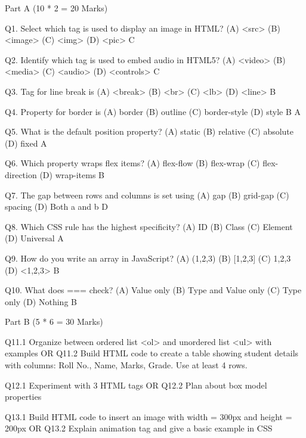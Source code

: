 
Part A (10 * 2 = 20 Marks)

Q1. Select which tag is used to display an image in HTML?
(A) <src> (B) <image> (C) <img> (D) <pic>                                                                  C

Q2. Identify which tag is used to embed audio in HTML5?
(A) <video> (B) <media> (C) <audio> (D) <controls>                                                         C

Q3. Tag for line break is
(A) <break> (B) <br> (C) <lb> (D) <line>                                                                   B

Q4. Property for border is
(A) border (B) outline (C) border-style (D) style  B                                                       A                                                      

Q5. What is the default position property?
(A) static (B) relative (C) absolute (D) fixed                                                             A                                                              

Q6. Which property wraps flex items?
(A) flex-flow (B) flex-wrap (C) flex-direction (D) wrap-items                                              B

Q7. The gap between rows and columns is set using
(A) gap (B) grid-gap (C) spacing (D) Both a and b                                                           D

Q8. Which CSS rule has the highest specificity?
(A) ID (B) Class (C) Element (D) Universal                                                                  A

Q9. How do you write an array in JavaScript?
(A) (1,2,3) (B) [1,2,3] (C) {1,2,3} (D) <1,2,3>                                                             B

Q10. What does === check?
(A) Value only     (B) Type and Value only   (C) Type only    (D) Nothing                                    B


Part B (5 * 6 = 30 Marks)

Q11.1 Organize between ordered list <ol> and unordered list <ul> with examples
OR
Q11.2 Build HTML code to create a table showing student details with columns: Roll No., Name, Marks, Grade. Use at least 4 rows.

Q12.1 Experiment with 3 HTML tags
OR
Q12.2 Plan about box model properties

Q13.1 Build HTML code to insert an image with width = 300px and height = 200px
OR
Q13.2 Explain animation tag and give a basic example in CSS

